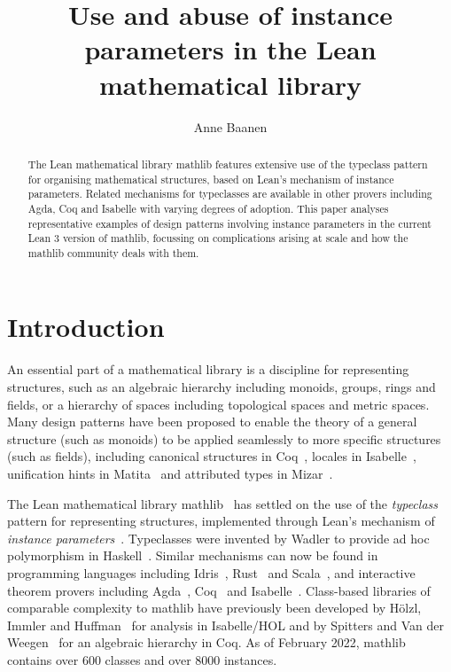 \documentclass[a4paper,UKenglish,cleveref, autoref, thm-restate]{lipics-v2021}
\title{Use and abuse of instance parameters in the Lean mathematical library}
\author{Anne Baanen}
{Department of Computer Science, Vrije Universiteit Amsterdam, The Netherlands \and \url{https://cs.vu.nl/~tbn305}}
{t.baanen@vu.nl}
{https://orcid.org/0000-0001-8497-3683}
{}
\newcommand{\mathlib}{\textsf{mathlib}\xspace}
\begin{document}
\maketitle

\begin{abstract}
The Lean mathematical library \mathlib features extensive use of the typeclass pattern for organising mathematical structures,
based on Lean's mechanism of instance parameters.
Related mechanisms for typeclasses are available in other provers including Agda, Coq and Isabelle with varying degrees of adoption.
This paper analyses representative examples of design patterns involving instance parameters in the current Lean 3 version of \mathlib,
focussing on complications arising at scale and how the \mathlib community deals with them.
\end{abstract}

\section{Introduction}

An essential part of a mathematical library is a discipline for representing structures,
such as an algebraic hierarchy including monoids, groups, rings and fields,
or a hierarchy of spaces including topological spaces and metric spaces.
Many design patterns have been proposed to enable the theory of a general structure (such as monoids) to be applied seamlessly to more specific structures (such as fields),
including canonical structures in Coq~\cite{Coq-Packed-classes}, locales in Isabelle~\cite{Isabelle-locale, ballarin-locales}, unification hints in Matita~\cite{matita-unification-hints} and attributed types in Mizar~\cite{Mizar-attributed-type}.

The Lean mathematical library \mathlib~\cite{mathlib} has settled on the use of the \emph{typeclass}~\cite{typeclasses-haskell} pattern for representing structures,
implemented through Lean's mechanism of \emph{instance parameters}~\cite{lean-prover, lean-elaboration}.
Typeclasses were invented by Wadler to provide ad hoc polymorphism in Haskell~\cite{typeclasses-haskell}.
Similar mechanisms can now be found in programming languages including Idris~\cite{Idris}, Rust~\cite[Chapter 6.11]{Rust-Reference} and Scala~\cite{Scala-Implicits},
and interactive theorem provers including Agda~\cite{Agda-Instance-Arguments}, Coq~\cite{Coq-first-class-type-class} and Isabelle~\cite{Isabelle-typeclasses}.
Class-based libraries of comparable complexity to \mathlib have previously been developed by Hölzl, Immler and Huffman~\cite{Isabelle-HOL-analysis-classes} for analysis in Isabelle/HOL
and by Spitters and Van der Weegen~\cite{Coq-typeclass-hierarchy} for an algebraic hierarchy in Coq.
As of February 2022, \mathlib contains over 600 classes and over 8000 instances.
\end{document}

